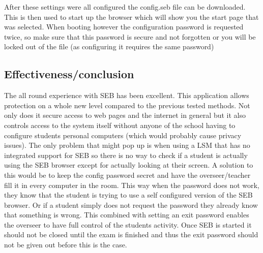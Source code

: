After these settings were all configured the config.seb file can be downloaded. This is then used to start up the browser which will show you the start page that was selected. When booting however the configuration password is requested twice, so make sure that this password is secure and not forgotten or you will be locked out of the file (as configuring it requires the same password)
\subsection{Effectiveness/conclusion}
The all round experience with SEB has been excellent. This application allows protection on a whole new level compared to the previous tested methods. Not only does it secure access to web pages and the internet in general but it also controls access to the system itself without anyone of the school having to configure students personal computers (which would probably cause  privacy issues). The only problem that might pop up is when using a LSM that has no integrated support for SEB so there is no way to check if a student is actually using the SEB browser except for actually looking at their screen. A solution to this would be to keep the config password secret and have the overseer/teacher fill it in every computer in the room. This way when the password does not work, they know that the student is trying to use a self configured version of the SEB browser. Or if a student simply does not request the password they already know that something is wrong. This combined with setting an exit password enables the overseer to have full control of the students activity. Once SEB is started it should not be closed until the exam is finished and thus the exit password should not be given out before this is the case.
